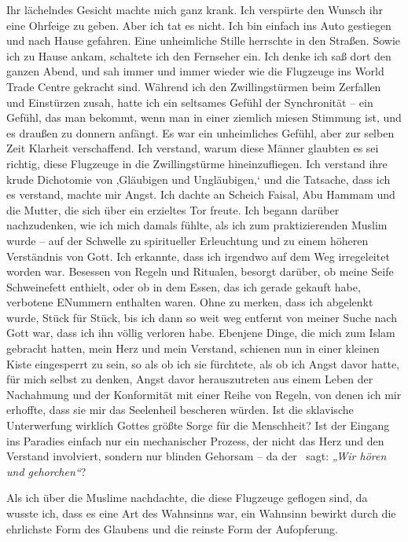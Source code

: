 \documentclass[12pt]{memoir}
\begin{document}
Ihr lächelndes Gesicht machte mich ganz krank.
Ich verspürte den Wunsch ihr eine Ohrfeige zu geben.
Aber ich tat es nicht.
Ich bin einfach ins Auto gestiegen und nach Hause gefahren.
Eine unheimliche Stille herrschte in den Straßen.
Sowie ich zu Hause ankam, schaltete ich den Fernseher ein.
Ich denke ich saß dort den ganzen Abend,
und sah immer und immer wieder wie die Flugzeuge
ins World Trade Centre gekracht sind.
Während ich den Zwillingstürmen beim Zerfallen und Einstürzen zusah,
hatte ich ein seltsames Gefühl der Synchronität –
ein Gefühl, das man bekommt,
wenn man in einer ziemlich miesen Stimmung ist,
und es draußen zu donnern anfängt.
Es war ein unheimliches Gefühl, aber zur selben Zeit Klarheit verschaffend.
Ich verstand, warum diese Männer glaubten es sei richtig,
diese Flugzeuge in die Zwillingstürme hineinzufliegen.
Ich verstand ihre krude Dichotomie von ‚Gläubigen und Ungläubigen,‘
und die Tatsache, dass ich es verstand, machte mir Angst.
Ich dachte an Scheich Faisal, Abu Hammam und die Mutter,
die sich über ein erzieltes Tor freute.
Ich begann darüber nachzudenken,
wie ich mich damals fühlte, als ich zum praktizierenden Muslim wurde –
auf der Schwelle zu spiritueller Erleuchtung
und zu einem höheren Verständnis von Gott.
Ich erkannte, dass ich irgendwo auf dem Weg irregeleitet worden war.
Besessen von Regeln und Ritualen, besorgt darüber,
ob meine Seife Schweinefett enthielt,
oder ob in dem Essen, das ich gerade gekauft habe,
verbotene E\–Nummern enthalten waren.
Ohne zu merken, dass ich abgelenkt wurde, Stück für Stück,
bis ich dann so weit weg entfernt von meiner Suche nach Gott war,
dass ich ihn völlig verloren habe.
Ebenjene Dinge, die mich zum Islam gebracht hatten,
mein Herz und mein Verstand,
schienen nun in einer kleinen Kiste eingesperrt zu sein,
so als ob ich sie fürchtete,
als ob ich Angst davor hatte, für mich selbst zu denken,
Angst davor herauszutreten aus einem Leben der Nachahmung
und der Konformität mit einer Reihe von Regeln,
von denen ich mir erhoffte, dass sie mir das Seelenheil bescheren würden.
Ist die sklavische Unterwerfung wirklich Gottes
größte Sorge für die Menschheit?
Ist der Eingang ins Paradies einfach nur ein mechanischer Prozess,
der nicht das Herz und den Verstand involviert,
sondern nur blinden Gehorsam – da der \Quran\ sagt:
\emph{„Wir hören und gehorchen“}?

Als ich über die Muslime nachdachte, die diese Flugzeuge geflogen sind,
da wusste ich, dass es eine Art des Wahnsinns war,
ein Wahnsinn bewirkt durch die ehrlichste Form des Glaubens
und die reinste Form der Aufopferung.
\end{document}
